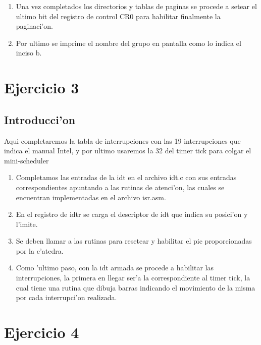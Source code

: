 \documentclass[11pt]{article}
\begin{document}
\begin{enumerate}
\item
Una vez completados los directorios y tablas de paginas se procede a setear el ultimo bit del registro de control CR0 para habilitar finalmente la paginaci'on.

\item
Por ultimo se imprime el nombre del grupo en pantalla como lo indica el inciso b.

\end{enumerate}



\section{Ejercicio 3}
\subsection{Introducci'on}
Aqui completaremos la tabla de interrupciones con las 19 interrupciones que indica el manual Intel, y por ultimo usaremos la 32 del timer tick para colgar el mini-scheduler
\begin{enumerate}
\item
Completamos las entradas de la idt en el archivo idt.c con sus entradas correspondientes apuntando a las rutinas de atenci'on, las cuales se encuentran implementadas en el archivo isr.asm.

\item
En el registro de idtr se carga el descriptor de idt que indica su posici'on y l'imite.

\item
Se deben llamar a las rutinas para resetear y habilitar el pic proporcionadas por la c'atedra.

\item
Como 'ultimo paso, con la idt armada se procede a habilitar las interrupciones, la primera en llegar ser'a la correspondiente al timer tick, la cual tiene una rutina que dibuja barras indicando el movimiento de la misma por cada interrupci'on realizada.

\end{enumerate}



\section{Ejercicio 4}
\end{document}
